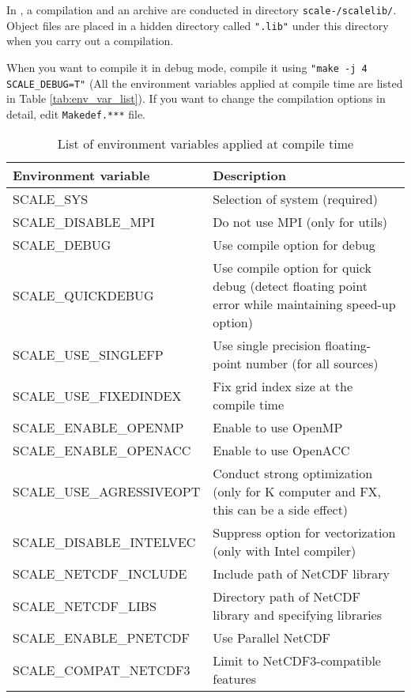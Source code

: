 In \scalelib, a compilation and an archive are conducted in directory \texttt{scale-{\version}/scalelib/}.
Object files are placed in a hidden directory called \verb|".lib"| under this directory when you carry out a compilation.

When you want to compile it in debug mode, compile it using \verb|"make -j 4 SCALE_DEBUG=T"|
(All the environment variables applied at compile time are listed in Table \ref{tab:env_var_list}).
If you want to change the compilation options in detail, edit \verb|Makedef.***| file.

\begin{table}[htb]
\begin{center}
\caption{List of environment variables applied at compile time}
\begin{tabularx}{150mm}{|l|X|} \hline
 \rowcolor[gray]{0.9} Environment variable & Description \\ \hline
 SCALE\_SYS               & Selection of system (required) \\ \hline
 SCALE\_DISABLE\_MPI      & Do not use MPI (only for utils) \\ \hline
 SCALE\_DEBUG             & Use compile option for debug \\ \hline
 SCALE\_QUICKDEBUG        & Use compile option for quick debug (detect floating point error while maintaining speed-up option) \\ \hline
 SCALE\_USE\_SINGLEFP     & Use single precision floating-point number (for all sources) \\ \hline
 SCALE\_USE\_FIXEDINDEX   & Fix grid index size at the compile time \\ \hline
 SCALE\_ENABLE\_OPENMP    & Enable to use OpenMP \\ \hline
 SCALE\_ENABLE\_OPENACC   & Enable to use OpenACC \\ \hline
 SCALE\_USE\_AGRESSIVEOPT & Conduct strong optimization (only for K computer and FX, this can be a side effect) \\ \hline
 SCALE\_DISABLE\_INTELVEC & Suppress option for vectorization (only with Intel compiler) \\ \hline
 SCALE\_NETCDF\_INCLUDE   & Include path of NetCDF library \\ \hline
 SCALE\_NETCDF\_LIBS      & Directory path of NetCDF library and specifying libraries \\ \hline
 SCALE\_ENABLE\_PNETCDF   & Use Parallel NetCDF \\ \hline
 SCALE\_COMPAT\_NETCDF3   & Limit to NetCDF3-compatible features \\ \hline

\end{tabularx}
\end{center}
\end{table}
